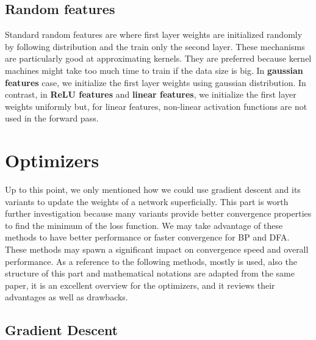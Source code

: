 \documentclass[a4paper, nobind]{templates/ociamthesis}
\begin{document}
\hypertarget{random-features}{%
\subsection{Random features}\label{random-features}}

Standard random features are where first layer weights are initialized randomly by following distribution and the train only the second layer. These mechanisms are particularly good at approximating kernels. They are preferred because kernel machines might take too much time to train if the data size is big. In \textbf{gaussian features} case, we initialize the first layer weights using gaussian distribution. In contrast, in \textbf{ReLU features} and \textbf{linear features}, we initialize the first layer weights uniformly but, for linear features, non-linear activation functions are not used in the forward pass.

\hypertarget{optimizers}{%
\section{Optimizers}\label{optimizers}}

Up to this point, we only mentioned how we could use gradient descent and its variants to update the weights of a network superficially. This part is worth further investigation because many variants provide better convergence properties to find the minimum of the loss function. We may take advantage of these methods to have better performance or faster convergence for BP and DFA. These methods may spawn a significant impact on convergence speed and overall performance. As a reference to the following methods, mostly \cite{DBLP:journals/corr/Ruder16} is used, also the structure of this part and mathematical notations are adapted from the same paper, it is an excellent overview for the optimizers, and it reviews their advantages as well as drawbacks.

\hypertarget{gradient-descent}{%
\subsection{Gradient Descent}\label{gradient-descent}}
\end{document}
